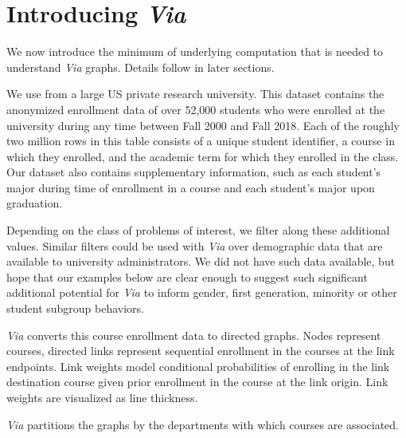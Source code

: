 \section{Introducing \em{Via}}
\label{sec:viaIntro}

We now introduce the minimum of underlying computation that is needed
to understand {\em Via} graphs. Details follow in later sections.

We use from a large US private research university. This dataset
contains the anonymized enrollment data of over 52,000 students who
were enrolled at the university during any time between Fall 2000 and
Fall 2018. Each of the roughly two million rows in this table consists
of a unique student identifier, a course in which they enrolled, and
the academic term for which they enrolled in the class. Our dataset
also contains supplementary information, such as each student's major
during time of enrollment in a course and each student's major upon
graduation.

Depending on the class of problems of interest, we filter along these
additional values. Similar filters could be used with {\em Via} over
demographic data that are available to university administrators. We
did not have such data available, but hope that our examples below are
clear enough to suggest such significant additional potential for {\em
  Via} to inform gender, first generation, minority or other student
subgroup behaviors.

{\em Via} converts this course enrollment data to directed graphs.
Nodes represent courses, directed links represent sequential
enrollment in the courses at the link endpoints. Link weights model
conditional probabilities of enrolling in the link destination course
given prior enrollment in the course at the link origin. Link weights
are visualized as line thickness.

{\em Via} partitions the graphs by the departments with which courses
are associated. 

